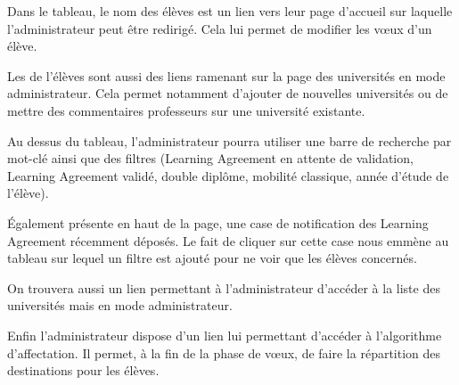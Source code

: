 Dans le tableau, le nom des élèves est un lien vers leur page d'accueil sur laquelle l'administrateur peut être redirigé. Cela lui permet de modifier les vœux d'un élève.
 \bigbreak

Les \voe de l'élèves sont aussi des liens ramenant sur la page des universités en mode administrateur. Cela permet notamment d'ajouter de nouvelles universités ou de mettre des commentaires professeurs sur une université existante.
 \bigbreak

Au dessus du tableau, l'administrateur pourra utiliser une barre de recherche par mot-clé ainsi que des filtres (Learning Agreement en attente de validation, Learning Agreement validé, double diplôme, mobilité classique, année d'étude de l'élève).
\bigbreak

Également présente en haut de la page, une case de notification des Learning Agreement récemment déposés. Le fait de cliquer sur cette case nous emmène au tableau sur lequel un filtre est ajouté pour ne voir que les élèves concernés.
\bigbreak

On trouvera aussi un lien permettant à l'administrateur d'accéder à la liste des universités mais en mode administrateur.
\bigbreak

Enfin l'administrateur dispose d'un lien lui permettant d'accéder à l'algorithme d'affectation. Il permet, à la fin de la phase de vœux, de faire la répartition des destinations pour les élèves.
\newpage